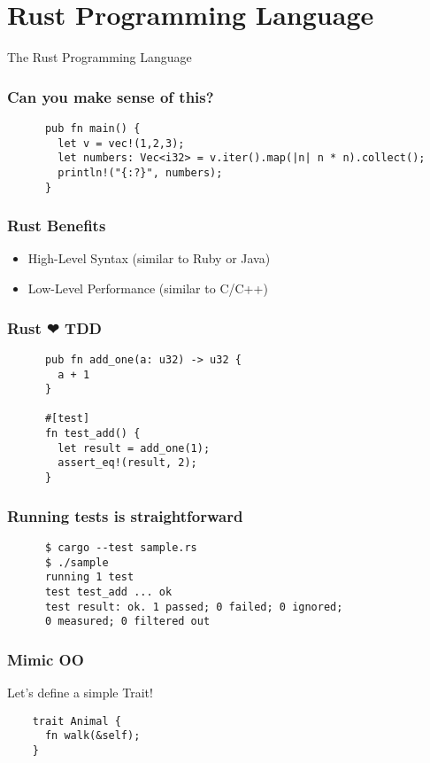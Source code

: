 \section{Rust Programming Language}
\label{sec:rust-language}

\begin{frame}
  \centerline{
    \huge{The Rust Programming Language}
  }
\end{frame}

\begin{frame}[fragile]
  \frametitle{Can you make sense of this?}
    \begin{verbatim}
      pub fn main() {
        let v = vec!(1,2,3);
        let numbers: Vec<i32> = v.iter().map(|n| n * n).collect();
        println!("{:?}", numbers);
      }
    \end{verbatim}
\end{frame}

\begin{frame}
  \frametitle{Rust Benefits}
  \begin{itemize}
  \item High-Level Syntax (similar to Ruby or Java)
  \item Low-Level Performance (similar to C/C++)
  \end{itemize}
\end{frame}

\begin{frame}[fragile]
  \frametitle{Rust {\DejaSans ❤} TDD}
    \begin{verbatim}
      pub fn add_one(a: u32) -> u32 {
        a + 1
      }

      #[test]
      fn test_add() {
        let result = add_one(1);
        assert_eq!(result, 2);
      }
    \end{verbatim}
\end{frame}

\begin{frame}[fragile]
  \frametitle{Running tests is straightforward}
    \begin{verbatim}
      $ cargo --test sample.rs
      $ ./sample
      running 1 test
      test test_add ... ok
      test result: ok. 1 passed; 0 failed; 0 ignored;
      0 measured; 0 filtered out
    \end{verbatim}
\end{frame}

\begin{frame}[fragile]
  \frametitle{Mimic OO}
  Let's define a simple Trait! \break{}
  \begin{verbatim}
    trait Animal {
      fn walk(&self);
    }
  \end{verbatim}
\end{frame}

